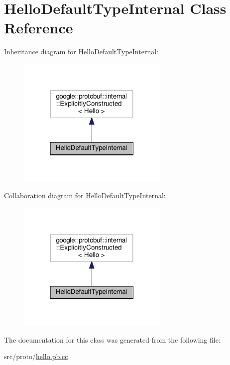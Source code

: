 \hypertarget{class_hello_default_type_internal}{}\section{Hello\+Default\+Type\+Internal Class Reference}
\label{class_hello_default_type_internal}


Inheritance diagram for Hello\+Default\+Type\+Internal\+:
\nopagebreak
\begin{figure}[H]
\begin{center}
\leavevmode
\includegraphics[width=205pt]{class_hello_default_type_internal__inherit__graph}
\end{center}
\end{figure}


Collaboration diagram for Hello\+Default\+Type\+Internal\+:
\nopagebreak
\begin{figure}[H]
\begin{center}
\leavevmode
\includegraphics[width=205pt]{class_hello_default_type_internal__coll__graph}
\end{center}
\end{figure}


The documentation for this class was generated from the following file\+:\begin{DoxyCompactItemize}
\item 
src/proto/\hyperlink{hello_8pb_8cc}{hello.\+pb.\+cc}\end{DoxyCompactItemize}
